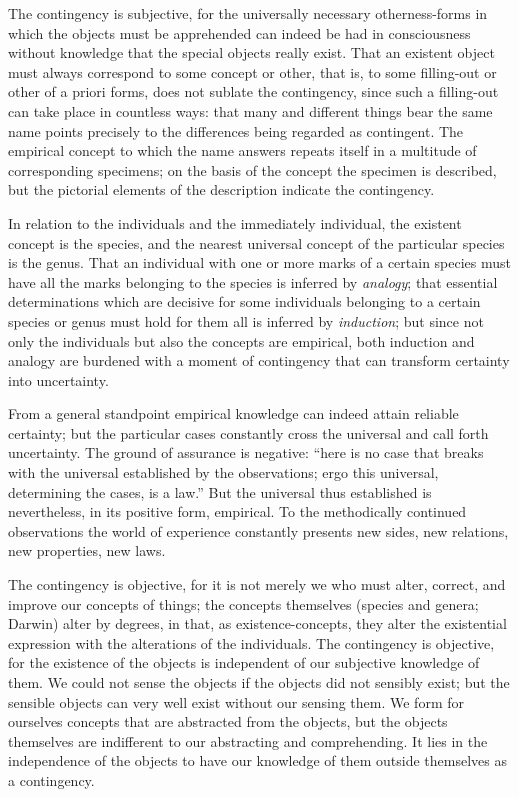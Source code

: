 \documentclass[12pt]{book}
\begin{document}
The contingency is subjective, for the universally necessary
otherness-forms in which the objects must be apprehended can indeed
be had in consciousness without knowledge that the special objects
really exist. That an existent object must always correspond to some
concept or other, that is, to some filling-out or other of a priori
forms, does not sublate the contingency, since such a filling-out
can take place in countless ways: that many and different things
bear the same name points precisely to the differences being
regarded as contingent. The empirical concept to which the name
answers repeats itself in a multitude of corresponding specimens; on
the basis of the concept the specimen is described, but the
pictorial elements of the description indicate the contingency.

In relation to the individuals and the immediately individual, the
existent concept is the species, and the nearest universal concept
of the particular species is the genus. That an individual with one
or more marks of a certain species must have all the marks belonging
to the species is inferred by \emph{analogy}; that essential
determinations which are decisive for some individuals belonging to
a certain species or genus must hold for them all is inferred by
\emph{induction}; but since not only the individuals but also the
concepts are empirical, both induction and analogy are burdened with
a moment of contingency that can transform certainty into
uncertainty.

From a general standpoint empirical knowledge can indeed attain
reliable certainty; but the particular cases
constantly cross the universal and call forth uncertainty. The
ground of assurance is negative: ``here is no case that breaks with
the universal established by the observations; ergo this universal,
determining the cases, is a law.'' But the universal thus
established is nevertheless, in its positive form, empirical. To the
methodically continued observations the world of experience
constantly presents new sides, new relations, new properties, new
laws.

The contingency is objective, for it is not merely we who must
alter, correct, and improve our concepts of things; the concepts
themselves (species and genera; Darwin) alter by degrees, in that,
as existence-concepts, they alter the existential expression with
the alterations of the individuals. The contingency is objective,
for the existence of the objects is independent of our subjective
knowledge of them. We could not sense the objects if the objects did
not sensibly exist; but the sensible objects can very well exist
without our sensing them. We form for ourselves concepts that are
abstracted from the objects, but the objects themselves are
indifferent to our abstracting and comprehending. It lies in the
independence of the objects to have our knowledge of them outside
themselves as a contingency.
\end{document}
